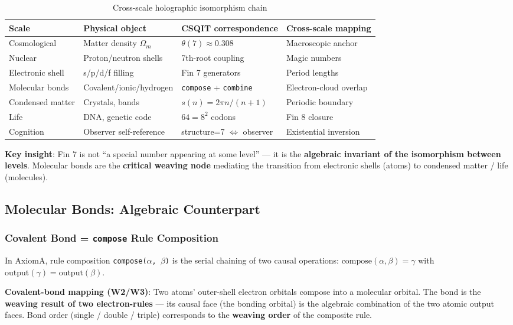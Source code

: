 \documentclass[aps,prd,twocolumn,nofootinbib,floatfix]{revtex4-2}
\begin{document}
\begin{table}[h]
\centering
\begin{tabular}{|l|l|l|l|}
\hline
Scale & Physical object & CSQIT correspondence & Cross-scale mapping \\
\hline
Cosmological & Matter density $\Omega_m$ & $\theta(7) \approx 0.308$ & Macroscopic anchor \\
Nuclear & Proton/neutron shells & 7th-root coupling & Magic numbers \\
Electronic shell & s/p/d/f filling & Fin 7 generators & Period lengths \\
Molecular bonds & Covalent/ionic/hydrogen & \texttt{compose} + \texttt{combine} & Electron-cloud overlap \\
Condensed matter & Crystals, bands & $s(n)=2\pi n/(n+1)$ & Periodic boundary \\
Life & DNA, genetic code & $64 = 8^2$ codons & Fin 8 closure \\
Cognition & Observer self-reference & structure=7 $\iff$ observer & Existential inversion \\
\hline
\end{tabular}
\caption{Cross-scale holographic isomorphism chain}
\end{table}

\textbf{Key insight}: Fin 7 is not ``a special number appearing at some level'' --- it is the \textbf{algebraic invariant of the isomorphism between levels}. Molecular bonds are the \textbf{critical weaving node} mediating the transition from electronic shells (atoms) to condensed matter / life (molecules).

\subsection{Molecular Bonds: Algebraic Counterpart}

\subsubsection{Covalent Bond = \texttt{compose} Rule Composition}

In AxiomA, rule composition \texttt{compose($\alpha$, $\beta$)} is the serial chaining of two causal operations: $\text{compose}(\alpha, \beta) = \gamma$ with $\text{output}(\gamma) = \text{output}(\beta)$.

\textbf{Covalent-bond mapping (W2/W3)}: Two atoms' outer-shell electron orbitals compose into a molecular orbital. The bond is the \textbf{weaving result of two electron-rules} --- its causal face (the bonding orbital) is the algebraic combination of the two atomic output faces. Bond order (single / double / triple) corresponds to the \textbf{weaving order} of the composite rule.
\end{document}
